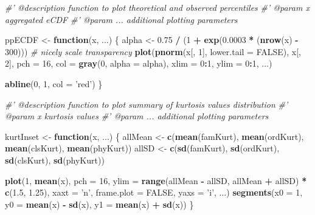 \documentclass[]{article}
\newenvironment{Shaded}{\begin{snugshade}}{\end{snugshade}}
\newcommand{\KeywordTok}[1]{\textcolor[rgb]{0.13,0.29,0.53}{\textbf{#1}}}
\newcommand{\DataTypeTok}[1]{\textcolor[rgb]{0.13,0.29,0.53}{#1}}
\newcommand{\DecValTok}[1]{\textcolor[rgb]{0.00,0.00,0.81}{#1}}
\newcommand{\FloatTok}[1]{\textcolor[rgb]{0.00,0.00,0.81}{#1}}
\newcommand{\StringTok}[1]{\textcolor[rgb]{0.31,0.60,0.02}{#1}}
\newcommand{\CommentTok}[1]{\textcolor[rgb]{0.56,0.35,0.01}{\textit{#1}}}
\newcommand{\OtherTok}[1]{\textcolor[rgb]{0.56,0.35,0.01}{#1}}
\newcommand{\ControlFlowTok}[1]{\textcolor[rgb]{0.13,0.29,0.53}{\textbf{#1}}}
\newcommand{\OperatorTok}[1]{\textcolor[rgb]{0.81,0.36,0.00}{\textbf{#1}}}
\newcommand{\NormalTok}[1]{#1}
\begin{document}
\begin{Shaded}
\begin{Highlighting}[]
\CommentTok{#' @description function to plot theoretical and observed percentiles}
\CommentTok{#' @param x aggregated eCDF}
\CommentTok{#' @param ... additional plotting parameters}

\NormalTok{ppECDF <-}\StringTok{ }\ControlFlowTok{function}\NormalTok{(x, ...) \{}
\NormalTok{    alpha <-}\StringTok{ }\FloatTok{0.75} \OperatorTok{/}\StringTok{ }\NormalTok{(}\DecValTok{1} \OperatorTok{+}\StringTok{ }\KeywordTok{exp}\NormalTok{(}\FloatTok{0.0003} \OperatorTok{*}\StringTok{ }\NormalTok{(}\KeywordTok{nrow}\NormalTok{(x) }\OperatorTok{-}\StringTok{ }\DecValTok{300}\NormalTok{))) }\CommentTok{# nicely scale transparency}
    \KeywordTok{plot}\NormalTok{(}\KeywordTok{pnorm}\NormalTok{(x[, }\DecValTok{1}\NormalTok{], }\DataTypeTok{lower.tail =} \OtherTok{FALSE}\NormalTok{), x[, }\DecValTok{2}\NormalTok{], }\DataTypeTok{pch =} \DecValTok{16}\NormalTok{,}
         \DataTypeTok{col =} \KeywordTok{gray}\NormalTok{(}\DecValTok{0}\NormalTok{, }\DataTypeTok{alpha =}\NormalTok{ alpha), }\DataTypeTok{xlim =} \DecValTok{0}\OperatorTok{:}\DecValTok{1}\NormalTok{, }\DataTypeTok{ylim =} \DecValTok{0}\OperatorTok{:}\DecValTok{1}\NormalTok{, ...)}
    
    \KeywordTok{abline}\NormalTok{(}\DecValTok{0}\NormalTok{, }\DecValTok{1}\NormalTok{, }\DataTypeTok{col =} \StringTok{'red'}\NormalTok{)}
\NormalTok{\}}


\CommentTok{#' @description function to plot summary of kurtosis values distribution}
\CommentTok{#' @param x kurtosis values}
\CommentTok{#' @param ... additional plotting parameters}

\NormalTok{kurtInset <-}\StringTok{ }\ControlFlowTok{function}\NormalTok{(x, ...) \{}
\NormalTok{    allMean <-}\StringTok{ }\KeywordTok{c}\NormalTok{(}\KeywordTok{mean}\NormalTok{(famKurt), }\KeywordTok{mean}\NormalTok{(ordKurt), }\KeywordTok{mean}\NormalTok{(clsKurt), }\KeywordTok{mean}\NormalTok{(phyKurt))}
\NormalTok{    allSD <-}\StringTok{ }\KeywordTok{c}\NormalTok{(}\KeywordTok{sd}\NormalTok{(famKurt), }\KeywordTok{sd}\NormalTok{(ordKurt), }\KeywordTok{sd}\NormalTok{(clsKurt), }\KeywordTok{sd}\NormalTok{(phyKurt))}
    
    \KeywordTok{plot}\NormalTok{(}\DecValTok{1}\NormalTok{, }\KeywordTok{mean}\NormalTok{(x), }\DataTypeTok{pch =} \DecValTok{16}\NormalTok{, }
         \DataTypeTok{ylim =} \KeywordTok{range}\NormalTok{(allMean }\OperatorTok{-}\StringTok{ }\NormalTok{allSD, allMean }\OperatorTok{+}\StringTok{ }\NormalTok{allSD) }\OperatorTok{*}\StringTok{ }\KeywordTok{c}\NormalTok{(}\FloatTok{1.5}\NormalTok{, }\FloatTok{1.25}\NormalTok{), }
         \DataTypeTok{xaxt =} \StringTok{'n'}\NormalTok{, }\DataTypeTok{frame.plot =} \OtherTok{FALSE}\NormalTok{, }\DataTypeTok{yaxs =} \StringTok{'i'}\NormalTok{, }
\NormalTok{         ...)}
    \KeywordTok{segments}\NormalTok{(}\DataTypeTok{x0 =} \DecValTok{1}\NormalTok{, }\DataTypeTok{y0 =} \KeywordTok{mean}\NormalTok{(x) }\OperatorTok{-}\StringTok{ }\KeywordTok{sd}\NormalTok{(x), }\DataTypeTok{y1 =} \KeywordTok{mean}\NormalTok{(x) }\OperatorTok{+}\StringTok{ }\KeywordTok{sd}\NormalTok{(x))}
\NormalTok{\}}





\end{Highlighting}
\end{Shaded}
\end{document}
